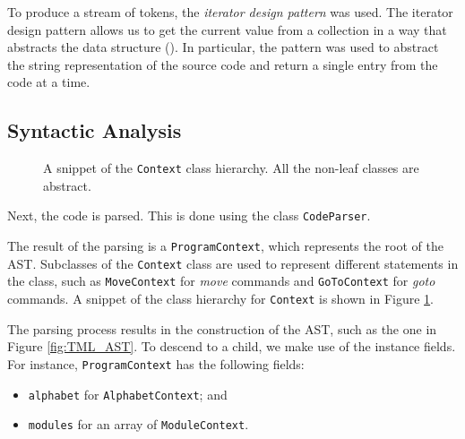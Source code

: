 To produce a stream of tokens, the \emph{iterator design pattern} was used. The iterator design pattern allows us to get the current value from a collection in a way that abstracts the data structure (\cite{gamma1995design}). In particular, the pattern was used to abstract the string representation of the source code and return a single entry from the code at a time. 

\subsection{Syntactic Analysis}
\begin{figure}[htb]
    \centering
    \caption{A snippet of the \texttt{Context} class hierarchy. All the non-leaf classes are abstract.}
    \label{fig:context_hierarchy}
\end{figure}

Next, the code is parsed. This is done using the class \texttt{CodeParser}. 

The result of the parsing is a \texttt{ProgramContext}, which represents the root of the AST. Subclasses of the \texttt{Context} class are used to represent different statements in the class, such as \texttt{MoveContext} for \textit{move} commands and \texttt{GoToContext} for \textit{goto} commands. A snippet of the class hierarchy for \texttt{Context} is shown in Figure \ref{fig:context_hierarchy}.

The parsing process results in the construction of the AST, such as the one in Figure \ref{fig:TML_AST}. To descend to a child, we make use of the instance fields. For instance, \texttt{ProgramContext} has the following fields:
\begin{itemize}
    \item \texttt{alphabet} for \texttt{AlphabetContext}; and
    \item \texttt{modules} for an array of \texttt{ModuleContext}.
\end{itemize}

